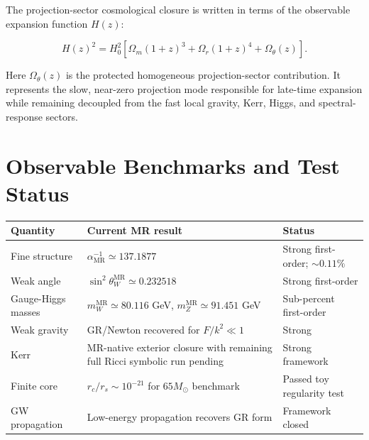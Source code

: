\documentclass[11pt]{article}
\newcommand{\MR}{\mathrm{MR}}
\begin{document}
The projection-sector cosmological closure is written in terms of the observable expansion function \(H(z)\):

\begin{equation}
H(z)^2 =
H_0^2
\left[
\Omega_m(1+z)^3
+
\Omega_r(1+z)^4
+
\Omega_\theta(z)
\right].
\end{equation}

Here \(\Omega_\theta(z)\) is the protected homogeneous projection-sector contribution. It represents the slow, near-zero projection mode responsible for late-time expansion while remaining decoupled from the fast local gravity, Kerr, Higgs, and spectral-response sectors.

\section{Observable Benchmarks and Test Status}
\begin{longtable}{>{\raggedright\arraybackslash}p{} >{\raggedright\arraybackslash}p{} >{\raggedright\arraybackslash}p{}}
\toprule
\textbf{Quantity} & \textbf{Current MR result} & \textbf{Status} \\
\midrule
\endhead
Fine structure & $\alpha^{-1}_{\MR}\simeq137.1877$ & Strong first-order; $\sim0.11\%$ \\
Weak angle & $\sin^2\theta_W^{\MR}\simeq0.232518$ & Strong first-order \\
Gauge-Higgs masses & $m_W^{\MR}\simeq80.116$ GeV, $m_Z^{\MR}\simeq91.451$ GeV & Sub-percent first-order \\
Weak gravity & GR/Newton recovered for $F/k^2\ll1$ & Strong \\
Kerr & MR-native exterior closure with remaining full Ricci symbolic run pending & Strong framework \\
Finite core & $r_c/r_s\sim10^{-21}$ for $65M_\odot$ benchmark & Passed toy regularity test \\
GW propagation & Low-energy propagation recovers GR form & Framework closed \\
\bottomrule
\end{longtable}
\end{document}
